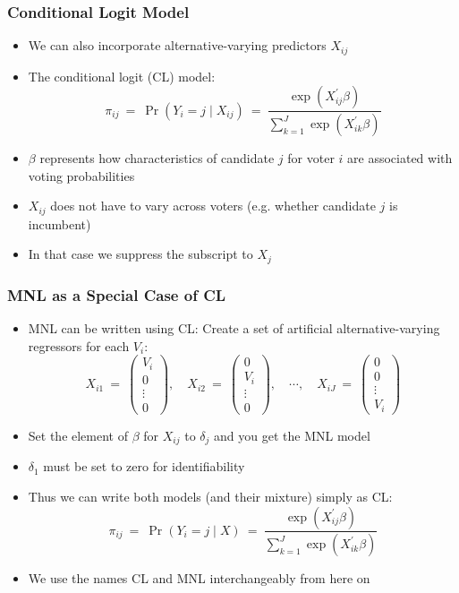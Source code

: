 \documentclass{beamer}
\begin{document}
\begin{frame}
\frametitle{Conditional Logit Model}
\begin{itemize}
 \item We can also incorporate \alert{alternative-varying predictors}
    $X_{ij}$
\pause
  \item The \alert{conditional logit (CL)} model:
    $$ \pi_{ij} \ = \ \Pr(Y_i = j\mid X_{ij}) \ = \
    \frac{\exp(X_{ij}^{'}\beta)}{\sum_{k=1}^J
      \exp(X_{ik}^{'}\beta)} $$
\pause
  \item $\beta$ represents how characteristics of candidate $j$ for voter
    $i$ are associated with voting probabilities
\medskip
\pause
  \item $X_{ij}$ does not have to vary across voters (e.g. whether candidate $j$ is incumbent)
  \item In that case we suppress the subscript to $X_j$
\end{itemize}
\end{frame}


\begin{frame}
\frametitle{MNL as a Special Case of CL}
\begin{itemize}
 \item MNL can be written using CL: Create a set of artificial alternative-varying regressors for each $V_i$:
{\small
   $$ X_{i1} \ = \ \left(\begin{array}{c} V_i \\ 0 \\ \vdots \\ 0 \end{array} \right), \quad
   X_{i2} \ = \ \left(\begin{array}{c} 0 \\ V_i \\ \vdots \\ 0 \end{array} \right),\quad \cdots, \quad
   X_{iJ} \ = \ \left(\begin{array}{c} 0 \\ 0 \\ \vdots \\ V_i \end{array} \right)$$
}
  \item Set the element of $\beta$ for $X_{ij}$ to $\delta_j$ and you get the MNL model
  \item $\delta_1$ must be set to zero for identifiability
\medskip
\pause
  \item Thus we can write both models (and their mixture) simply as CL:
    $$ \pi_{ij} \ = \ \Pr(Y_i = j\mid X) \ = \
    \frac{\exp(X_{ij}^{'}\beta)}{\sum_{k=1}^J
      \exp(X_{ik}^{'}\beta)} $$
  \item We use the names CL and MNL interchangeably from here on
\end{itemize}
\end{frame}
\end{document}
